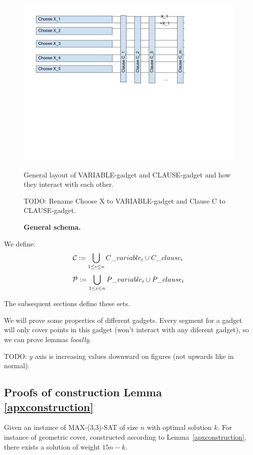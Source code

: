 \begin{figure}
\centering
\includegraphics[width=\linewidth]{segment_apx_sketch.jpg}
\caption{\textbf{General schema.}}
General layout of VARIABLE-gadget and CLAUSE-gadget and how they
interact with each other.

TODO: Rename Choose X to VARIABLE-gadget and Clause C to CLAUSE-gadget.
\label{fig:segment_apx_sketch}
\end{figure}

We define:
$$\mathcal{C} := \bigcup_{1 \le i \le n} C\_variable_i \cup C\_clause_i $$
$$\mathcal{P} := \bigcup_{1 \le i \le n} P\_variable_i \cup P\_clause_i $$

The subsequent sections define these sets.

We will prove some properties of different gadgets.
Every segment for a gadget will only cover points 
in this gadget (won't interact with any diferent gadget),
so we can prove lemmas \textit{locally}.


TODO: $y$ axis is increasing values downward on figures
(not upwards like in normal).

\subsection{Proofs of construction Lemma \ref{apxconstruction}}
\begin{lemma}
	\label{construction_correctness}
	Given an instance of MAX-(3,3)-SAT of size $n$
	with optimal solution $k$.
	For instance of geometric cover, constructed
	according to Lemma~\ref{apxconstruction}, 
	there exists a solution of weight $15n - k$.
\end{lemma}
